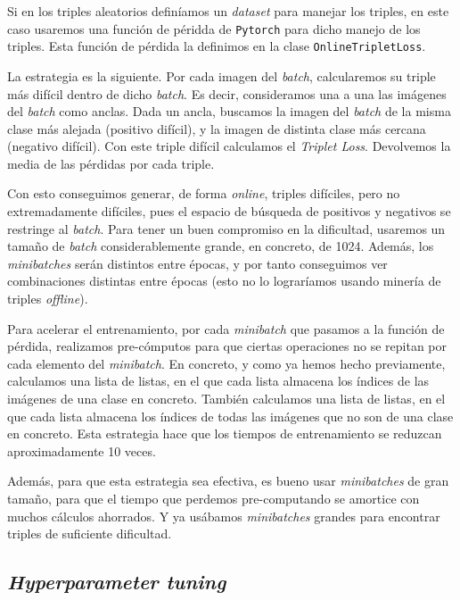 \documentclass[11pt]{article}
\begin{document}
Si en los triples aleatorios definíamos un \emph{dataset} para manejar los triples, en este caso usaremos una función de péridda de \lstinline{Pytorch} para dicho manejo de los triples. Esta función de pérdida la definimos en la clase \lstinline{OnlineTripletLoss}. 

La estrategia es la siguiente. Por cada imagen del \emph{batch}, calcularemos su triple más difícil dentro de dicho \emph{batch}. Es decir, consideramos una a una las imágenes del \emph{batch} como anclas. Dada un ancla, buscamos la imagen del \emph{batch} de la misma clase más alejada (positivo difícil), y la imagen de distinta clase más cercana (negativo difícil). Con este triple difícil calculamos el \emph{Triplet Loss}. Devolvemos la media de las pérdidas por cada triple.

Con esto conseguimos generar, de forma \emph{online}, triples difíciles, pero no extremadamente difíciles, pues el espacio de búsqueda de positivos y negativos se restringe al \emph{batch}. Para tener un buen compromiso en la dificultad, usaremos un tamaño de \emph{batch} considerablemente grande, en concreto, de 1024. Además, los \emph{minibatches} serán distintos entre épocas, y por tanto conseguimos ver combinaciones distintas entre épocas (esto no lo lograríamos usando minería de triples \emph{offline}).

Para acelerar el entrenamiento, por cada \emph{minibatch} que pasamos a la función de pérdida, realizamos pre-cómputos para que ciertas operaciones no se repitan por cada elemento del \emph{minibatch}. En concreto, y como ya hemos hecho previamente, calculamos una lista de listas, en el que cada lista almacena los índices de las imágenes de una clase en concreto. También calculamos una lista de listas, en el que cada lista almacena los índices de todas las imágenes que no son de una clase en concreto. Esta estrategia hace que los tiempos de entrenamiento se reduzcan aproximadamente 10 veces. 

Además, para que esta estrategia sea efectiva, es bueno usar \emph{minibatches} de gran tamaño, para que el tiempo que perdemos pre-computando se amortice con muchos cálculos ahorrados. Y ya usábamos \emph{minibatches} grandes para encontrar triples de suficiente dificultad.

\subsection{\emph{Hyperparameter tuning}} \label{hyperparameter_tuning:seccion}
\end{document}
